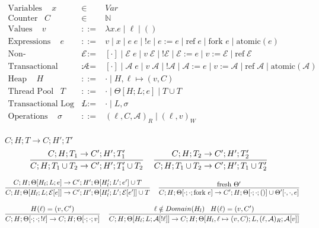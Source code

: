 \documentclass[9pt]{article}
\newcommand{\aeval}[1]{\mathcal{A}[#1]}
\newcommand{\actxt}[0]{\mathcal{A}}
\newcommand{\eval}[1]{\mathcal{E}[#1]}
\newcommand{\ctxt}[0]{\mathcal{E}}
\newcommand{\loc}[0]{\ell}
\newcommand{\atomic}[1]{\text{atomic}(#1)}
\newcommand{\alloc}[1]{\text{ref} \; #1}
\newcommand{\fork}[1]{\text{fork } #1}
\begin{document}
\begingroup\makeatletter{}\check@mathfonts


\begin{displaymath}
\begin{array}{rcll}
\text{Variables } \;\;\; x &\in& Var \\
\text{Counter} \;\;\; C &\in& \mathbb{N} \\
\text{Values } \;\;\; v &::=& \lambda x. e \; | \; \loc \; | \; () \\
\text{Expressions } \;\;\; e &::=& v \; | \; x \; | \; e \; e \; | \; !e \; | \; e := e \; | \; \alloc{e} \; | \; \fork{e} \; | \; \atomic{e}\\
\text{Non-Transactional Context } \;\;\; \ctxt &::=& [\cdot] \; | \; \ctxt \; e \; | \; v \; \ctxt \; | \; ! \ctxt \; | \; \ctxt := e \; | \; v := \ctxt \; | \; \alloc{\ctxt} \\
\text{Transactional Context } \;\;\; \actxt &::=& [\cdot] \; | \; \actxt \; e \; | \; v \; \actxt \; | \; ! \actxt \; | \; \actxt := e \; | \; v := \actxt \; | \; \alloc{\actxt} \; | \; \atomic{\actxt} \\
\text{Heap } \;\;\; H &::=& \cdot \; | \; H, \loc \mapsto (v, C) \\
\text{Thread Pool} \;\;\; T &::=& \cdot \; | \; \Theta[H; L; e] \; | \; T \cup T \\
\text{Transactional Log } \;\;\; L &::=& \cdot \; | \; L, \sigma \\
\text{Operations } \;\;\; \sigma &::=& (\loc, C, \actxt)_R \; | \; (\loc, v)_W \\
\end{array}
\end{displaymath}


$\boxed{C; H; T \rightarrow C; H' ;T'}$
\[%
\infer[]{C; H; T_1 \cup T_2 \rightarrow C'; H'; T_1' \cup T_2}{C; H; T_1 \rightarrow C'; H'; T_1'} \;\;\;
\infer[]{C; H; T_1 \cup T_2 \rightarrow C'; H'; T_1 \cup T_2'}{C; H; T_2 \rightarrow C'; H'; T_2'} \;\;\; 
\]

\[%
\infer[]{C; H; \Theta[H_l; L; \eval{e}] \rightarrow C'; H'; \Theta[H_l'; L'; \eval{e'}] \cup T}{C; H; \Theta[H_l; L; e] \rightarrow C'; H'; \Theta[H_l'; L'; e'] \cup T} \;\;\;
\infer[]{C; H; \Theta[\cdot; \cdot; \fork{e}] \rightarrow C'; H; \Theta[\cdot; \cdot; ()] \cup \Theta'[\cdot, \cdot, e]}{\text{fresh } \Theta'}
\]

\[%
\infer[]{C; H; \Theta[\cdot; \cdot; !\loc] \rightarrow C; H; \Theta[\cdot; \cdot; v]}{H(\loc) = (v, C')} \;\;\;
\infer[]{C; H; \Theta[H_l; L; \aeval{!\loc}] \rightarrow C; H; \Theta[H_l, \loc \mapsto (v, C); L, (\loc, \actxt)_R; \aeval{v}]}{\loc \notin Domain(H_l) \;\;\; H(\loc) = (v, C') } 
\]
\end{document}
